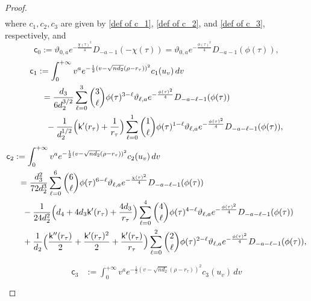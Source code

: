 \documentclass[reqno]{amsart}
\newcommand{\1}{\mathds{1}}
\numberwithin{equation}{section}
\theoremstyle{definition}
\begin{document}
\begin{proof}
\begin{align}
\end{align}
where $c_1,c_2,c_3$ are given by \eqref{def of c_1}, \eqref{def of c_2}, and \eqref{def of c_3}, respectively, and 
\begin{equation}
\label{def of sfc0}
\mathsf{c}_0
:= 
\vartheta_{0,a}
e^{-\frac{\chi(\tau)^2}{4}}D_{-a-1}(-\chi(\tau))
=
\vartheta_{0,a}
e^{-\frac{\phi(\tau)^2}{4}}D_{-a-1}(\phi(\tau)), 
\end{equation}
\begin{align}
\begin{split}
\label{def of sfc1}
\mathsf{c}_1
&:=
\int_{0}^{+\infty}
v^{a}
e^{-\frac{1}{2}(v-\sqrt{nd_2}(\rho-r_{\tau}))^2}c_1(u_v)\,dv 
\\
&\,\,\,=
\frac{d_3}{6d_2^{3/2}}
\sum_{\ell=0}^{3}\binom{3}{\ell}\phi(\tau)^{3-\ell}\vartheta_{\ell,a}e^{-\frac{\phi(\tau)^2}{4}}D_{-a-\ell-1}(\phi(\tau))
\\
&\quad
-
\frac{1}{d_2^{1/2}}\Bigl(\mathsf{k}'(r_{\tau})+\frac{1}{r_{\tau}}\Bigr)
\sum_{\ell=0}^{1}\binom{1}{\ell}\phi(\tau)^{1-\ell}\vartheta_{\ell,a}e^{-\frac{\phi(\tau)^2}{4}}D_{-a-\ell-1}(\phi(\tau)), 
\end{split}
\end{align}
\begin{align}
\begin{split}
\label{def of sfc2}
\mathsf{c}_2
&:=\int_{0}^{+\infty}
v^{a}
e^{-\frac{1}{2}(v-\sqrt{nd_2}(\rho-r_{\tau}))^2}c_2(u_v)\,dv  
\\
&\,\,\,=
\frac{d_3^2}{72d_2^3}\sum_{\ell=0}^{6}\binom{6}{\ell}\phi(\tau)^{6-\ell}\vartheta_{\ell,a}e^{-\frac{\chi(\tau)^2}{4}}D_{-a-\ell-1}(\phi(\tau))
\\
&\quad
-\frac{1}{24d_2^2}
\Bigl(d_4+4d_3\mathsf{k}'(r_{\tau})+\frac{4d_3}{r_{\tau}}\Bigr)
\sum_{\ell=0}^{4}\binom{4}{\ell}\phi(\tau)^{4-\ell}
\vartheta_{\ell,a}e^{-\frac{\phi(\tau)^2}{4}}D_{-a-\ell-1}(\phi(\tau))
\\
&\quad
+\frac{1}{d_2}\Bigl(\frac{\mathsf{k}''(r_{\tau})}{2}+\frac{\mathsf{k}'(r_{\tau})^2}{2}+\frac{\mathsf{k}'(r_{\tau})}{r_{\tau}}\Bigr)
\sum_{\ell=0}^{2}\binom{2}{\ell}\phi(\tau)^{2-\ell}
\vartheta_{\ell,a}e^{-\frac{\phi(\tau)^2}{4}}D_{-a-\ell-1}(\phi(\tau)), 
\end{split}
\end{align}
\begin{align}
\begin{split}
\label{def of sfc3}
\mathsf{c}_3
&:=\int_{0}^{+\infty}
v^{a}
e^{-\frac{1}{2}(v-\sqrt{nd_2}(\rho-r_{\tau}))^2}c_3(u_v)\,dv  
\\

\end{split}
\end{align}
\end{proof}
\end{document}
